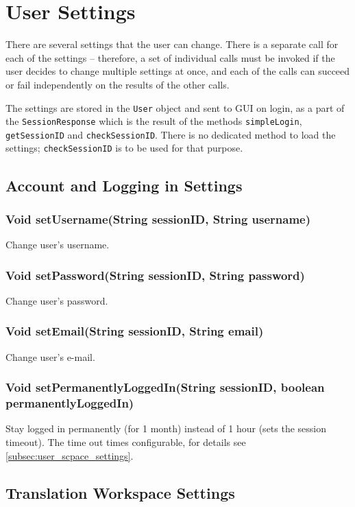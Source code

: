 \section{User Settings}
\label{sec:rpc:settings}

There are several settings that the user can change. There is a separate call for each of the settings -- therefore, a set of individual calls must be invoked if the user decides to change multiple settings at once, and each of the calls can succeed or fail independently on the results of the other calls.

The settings are stored in the {\tt User} object and sent to GUI on login, as a part of the {\tt SessionResponse} which is the result of the methods {\tt simpleLogin}, {\tt getSessionID} and {\tt checkSessionID}. There is no dedicated method to load the settings; {\tt checkSessionID} is to be used for that purpose.

\subsection{Account and Logging in Settings}

\subsubsection{Void setUsername(String sessionID, String username)}
Change user's username.

\subsubsection{Void setPassword(String sessionID, String password)}
Change user's password.

\subsubsection{Void setEmail(String sessionID, String email)}
Change user's e-mail.

\subsubsection{Void setPermanentlyLoggedIn(String sessionID, boolean permanentlyLoggedIn)}
Stay logged in permanently (for 1 month) instead of 1 hour (sets the session timeout). The time out times configurable, for details see \ref{subsec:user_scpace_settings}.

\subsection{Translation Workspace Settings}

